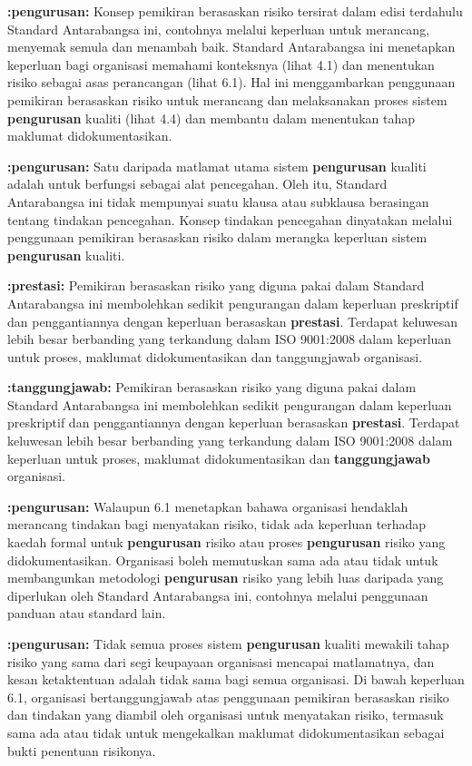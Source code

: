 \documentclass{article}
\begin{document}
\textbf{:pengurusan:} Konsep pemikiran berasaskan risiko tersirat dalam edisi terdahulu Standard Antarabangsa
ini, contohnya melalui keperluan untuk merancang, menyemak semula dan menambah baik.
Standard Antarabangsa ini menetapkan keperluan bagi organisasi memahami konteksnya
(lihat 4.1) dan menentukan risiko sebagai asas perancangan (lihat 6.1). Hal ini
menggambarkan penggunaan pemikiran berasaskan risiko untuk merancang dan
melaksanakan proses sistem \textbf{pengurusan} kualiti (lihat 4.4) dan membantu dalam menentukan
tahap maklumat didokumentasikan.

\textbf{:pengurusan:} Satu daripada matlamat utama sistem \textbf{pengurusan} kualiti adalah untuk berfungsi sebagai alat
pencegahan. Oleh itu, Standard Antarabangsa ini tidak mempunyai suatu klausa atau
subklausa berasingan tentang tindakan pencegahan. Konsep tindakan pencegahan
dinyatakan melalui penggunaan pemikiran berasaskan risiko dalam merangka keperluan
sistem \textbf{pengurusan} kualiti.

\textbf{:prestasi:} Pemikiran berasaskan risiko yang diguna pakai dalam Standard Antarabangsa ini
membolehkan sedikit pengurangan dalam keperluan preskriptif dan penggantiannya dengan
keperluan berasaskan \textbf{prestasi}. Terdapat keluwesan lebih besar berbanding yang terkandung
dalam ISO 9001:2008 dalam keperluan untuk proses, maklumat didokumentasikan dan
tanggungjawab organisasi.

\textbf{:tanggungjawab:} Pemikiran berasaskan risiko yang diguna pakai dalam Standard Antarabangsa ini
membolehkan sedikit pengurangan dalam keperluan preskriptif dan penggantiannya dengan
keperluan berasaskan \textbf{prestasi}. Terdapat keluwesan lebih besar berbanding yang terkandung
dalam ISO 9001:2008 dalam keperluan untuk proses, maklumat didokumentasikan dan
\textbf{tanggungjawab} organisasi.

\textbf{:pengurusan:} Walaupun 6.1 menetapkan bahawa organisasi hendaklah merancang tindakan bagi
menyatakan risiko, tidak ada keperluan terhadap kaedah formal untuk \textbf{pengurusan} risiko atau
proses \textbf{pengurusan} risiko yang didokumentasikan. Organisasi boleh memutuskan sama ada
atau tidak untuk membangunkan metodologi \textbf{pengurusan} risiko yang lebih luas daripada yang
diperlukan oleh Standard Antarabangsa ini, contohnya melalui penggunaan panduan atau
standard lain.

\textbf{:pengurusan:} Tidak semua proses sistem \textbf{pengurusan} kualiti mewakili tahap risiko yang sama dari segi
keupayaan organisasi mencapai matlamatnya, dan kesan ketaktentuan adalah tidak sama
bagi semua organisasi. Di bawah keperluan 6.1, organisasi bertanggungjawab atas
penggunaan pemikiran berasaskan risiko dan tindakan yang diambil oleh organisasi untuk
menyatakan risiko, termasuk sama ada atau tidak untuk mengekalkan maklumat
didokumentasikan sebagai bukti penentuan risikonya.
\end{document}
